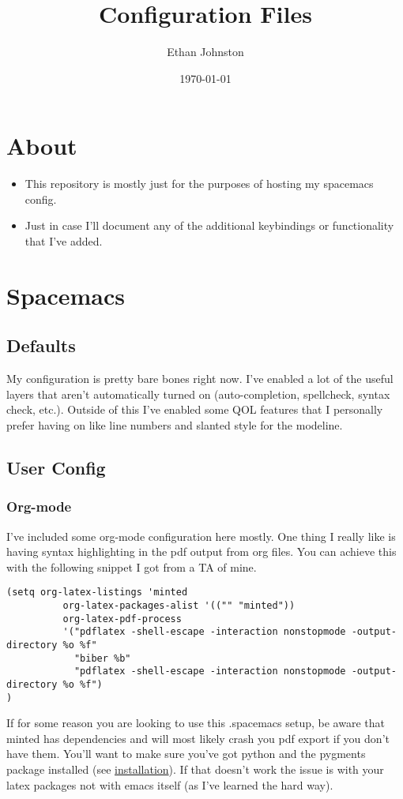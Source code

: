 \documentclass[11pt]{article}
\author{Ethan Johnston}
\date{\today}
\title{Configuration Files}
\begin{document}
\maketitle


\section{About}
\label{sec:orgcd02a43}
\begin{itemize}
\item This repository is mostly just for the purposes of hosting my spacemacs config.
\item Just in case I'll document any of the additional keybindings or functionality that I've added.
\end{itemize}
\section{Spacemacs}
\label{sec:org0341940}
\subsection{Defaults}
\label{sec:org6f0210c}
My configuration is pretty bare bones right now. I've enabled a lot of the useful layers that aren't automatically
turned on (auto-completion, spellcheck, syntax check, etc.). Outside of this I've enabled some QOL features that I
personally prefer having on like line numbers and slanted style for the modeline.
\subsection{User Config}
\label{sec:org02dace0}
\subsubsection{Org-mode}
\label{sec:org273c2a3}
I've included some org-mode configuration here mostly. One thing I really like is having syntax highlighting 
in the pdf output from org files. You can achieve this with the following snippet I got from a TA of mine.
\begin{verbatim}
(setq org-latex-listings 'minted
          org-latex-packages-alist '(("" "minted"))
          org-latex-pdf-process
          '("pdflatex -shell-escape -interaction nonstopmode -output-directory %o %f"
            "biber %b"
            "pdflatex -shell-escape -interaction nonstopmode -output-directory %o %f")
)
\end{verbatim}
If for some reason you are looking to use this .spacemacs setup, be aware
that minted has dependencies and will most likely crash you pdf export if you don't have them. You'll want
to make sure you've got python and the pygments package installed (see \href{http://pygments.org/download/}{installation}). If that doesn't work
the issue is with your latex packages not with emacs itself (as I've learned the hard way).
\end{document}

